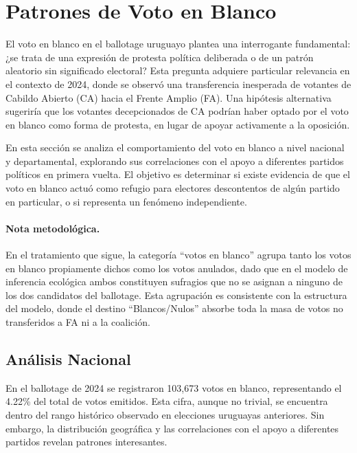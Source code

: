 \section{Patrones de Voto en Blanco}
\label{sec:blank_votes}

El voto en blanco en el ballotage uruguayo plantea una interrogante fundamental: ¿se trata de una expresión de protesta política deliberada o de un patrón aleatorio sin significado electoral? Esta pregunta adquiere particular relevancia en el contexto de 2024, donde se observó una transferencia inesperada de votantes de Cabildo Abierto (CA) hacia el Frente Amplio (FA). Una hipótesis alternativa sugeriría que los votantes decepcionados de CA podrían haber optado por el voto en blanco como forma de protesta, en lugar de apoyar activamente a la oposición.

En esta sección se analiza el comportamiento del voto en blanco a nivel nacional y departamental, explorando sus correlaciones con el apoyo a diferentes partidos políticos en primera vuelta. El objetivo es determinar si existe evidencia de que el voto en blanco actuó como refugio para electores descontentos de algún partido en particular, o si representa un fenómeno independiente.

\paragraph{Nota metodológica.} En el tratamiento que sigue, la categoría ``votos en blanco'' agrupa tanto los votos en blanco propiamente dichos como los votos anulados, dado que en el modelo de inferencia ecológica ambos constituyen sufragios que no se asignan a ninguno de los dos candidatos del ballotage. Esta agrupación es consistente con la estructura del modelo, donde el destino ``Blancos/Nulos'' absorbe toda la masa de votos no transferidos a FA ni a la coalición.

\subsection{Análisis Nacional}
\label{subsec:blank_national}

En el ballotage de 2024 se registraron 103,673 votos en blanco, representando el 4.22\% del total de votos emitidos. Esta cifra, aunque no trivial, se encuentra dentro del rango histórico observado en elecciones uruguayas anteriores. Sin embargo, la distribución geográfica y las correlaciones con el apoyo a diferentes partidos revelan patrones interesantes.

